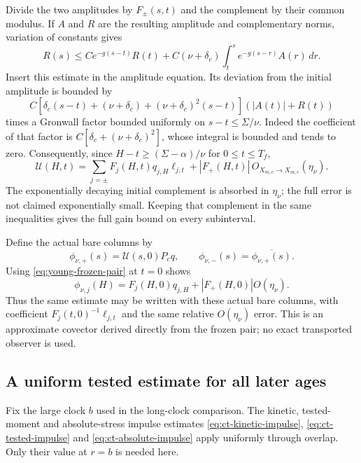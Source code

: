Divide the two amplitudes by $F_\pm(s,t)$ and the complement by
their common modulus. If $A$ and $R$ are the resulting amplitude
and complementary norms, variation of constants gives
\[
 R(s)\le Ce^{-g(s-t)}R(t)
       +C(\nu+\delta_c)\int_t^s e^{-g(s-r)}A(r)\,dr.
\]
Insert this estimate in the amplitude equation. Its deviation from
the initial amplitude is bounded by
\[
 C\left[\delta_c(s-t)+(\nu+\delta_c)
                 +(\nu+\delta_c)^2(s-t)\right]
       (|A(t)|+R(t))
\]
times a Gronwall factor bounded uniformly on $s-t\le\Sigma/\nu$.
Indeed the coefficient of that factor is
$C[\delta_c+(\nu+\delta_c)^2]$, whose integral is bounded and
tends to zero. Consequently, since $H-t\ge(\Sigma-\alpha)/\nu$ for
$0\le t\le T_f$,
\begin{equation}\label{eq:young-frozen-pair}
 \mathcal U(H,t)=
 \sum_{j=\pm}F_j(H,t)q_{j,H}\ell_{j,t}
       +|F_+(H,t)|\,O_{X_{m,c}\to X_{m,c}}(\eta_\nu).
\end{equation}
The exponentially decaying initial complement is absorbed in
$\eta_\nu$; the full error is not claimed exponentially small.
Keeping that complement in the same inequalities gives the full
gain bound on every subinterval.

Define the actual bare columns by
\[
 \phi_{\nu,+}(s)=\mathcal U(s,0)P_cq,\qquad
 \phi_{\nu,-}(s)=\overline{\phi_{\nu,+}(s)}.
\]
Using \eqref{eq:young-frozen-pair} at $t=0$ shows
\[
 \phi_{\nu,j}(H)=F_j(H,0)q_{j,H}
                          +|F_+(H,0)|O(\eta_\nu).
\]
Thus the same estimate may be written with these actual bare columns,
with coefficient $F_j(t,0)^{-1}\ell_{j,t}$ and the same relative
$O(\eta_\nu)$ error. This is an approximate covector derived directly
from the frozen pair; no exact transported observer is used.

\subsection{A uniform tested estimate for all later ages}

Fix the large clock $b$ used in the long-clock comparison.
The kinetic, tested-moment and absolute-stress impulse estimates
\eqref{eq:ct-kinetic-impulse}, \eqref{eq:ct-tested-impulse} and
\eqref{eq:ct-absolute-impulse} apply uniformly through overlap.
Only their value at $r=b$ is needed here.

